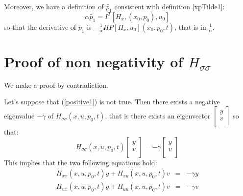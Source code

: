 \documentclass[a4paper,10pt]{article}
\begin{document}
Moreover, we have a definition of $\tilde{p_{1}}$ consistent with 
definition \ref{xpTilde1}:
\begin{equation*}
    \alpha \tilde{p_{1}} =  I^{T}[H_{x},(x_{0},p_{0}),u_{0}]
    \label{ptilde1}
\end{equation*}
so that the derivative of $\tilde{p_{1}}$ is 
$-\frac{1}{\alpha}HP[H_{x},u_{0}](x_{0},p_{0},t)$, that is in $\frac{1}{\alpha}$.

\section{Proof of non negativity of $H_{\sigma 
\sigma}$}\label{HsigmasigmaProof}
   We make a proof by contradiction.
    
    Let's suppose that (\ref{positive1}) is not true. Then there 
    exists a negative 
    eigenvalue $- \gamma$ of $H_{\sigma \sigma}(x,u,p_{0},t)$, that is there 
    exists an eigenvector $ \left[
    \begin{array}
    {c}
        
        y  \\
        
        v  \\
        
         
    \end{array}
    \right]$ so that:
    \[
        H_{\sigma \sigma}(x,u,p_{0},t) \left[
    \begin{array}
    {c}
        
        y  \\
        
        v  \\
        
         
    \end{array}
    \right]
    = - \gamma  \left[
    \begin{array}
    {c}
        
        y  \\
        
        v  \\
        
         
    \end{array}
    \right]
    \]
    This implies that the two following equations hold:
    \begin{eqnarray}
        H_{xx}(x,u,p_{0},t)y + H_{xu}(x,u,p_{0},t)v & = & - \gamma y
        \label{gammay}\\
        H_{ux}(x,u,p_{0},t)y + H_{uu}(x,u,p_{0},t)v & = & - \gamma v
        \label{gammav}
    \end{eqnarray}
\end{document}
